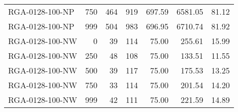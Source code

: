 \begin{table}[htbp]
{\begin{tabular}{lrrrrrr}
    RGA-0128-100-NP & 750    & 464    & 919    & 697.59 & 6581.05 & 81.12 \\
    RGA-0128-100-NP & 999    & 504    & 983    & 696.95 & 6710.74 & 81.92 \\ \hline
    RGA-0128-100-NW & 0      & 39     & 114    & 75.00  & 255.61 & 15.99 \\
    RGA-0128-100-NW & 250    & 48     & 108    & 75.00  & 133.51 & 11.55 \\
    RGA-0128-100-NW & 500    & 39     & 117    & 75.00  & 175.53 & 13.25 \\
    RGA-0128-100-NW & 750    & 33     & 114    & 75.00  & 201.54 & 14.20 \\
    RGA-0128-100-NW & 999    & 42     & 111    & 75.00  & 221.59 & 14.89 \\
    \bottomrule
    \end{tabular}}
  \label{tab:addlabel}%
\end{table}%
